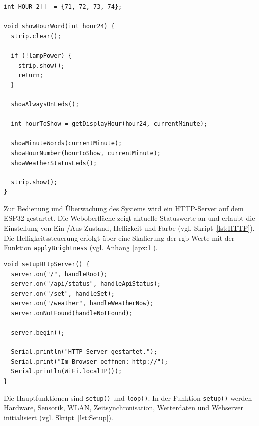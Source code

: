 \begin{lstlisting}[style=arduino,caption={Hauptanzeigefunktion der WordClock.},label={lst:WortSetzen}]
int HOUR_2[]  = {71, 72, 73, 74};

void showHourWord(int hour24) {
  strip.clear();

  if (!lampPower) {
    strip.show();
    return;
  }

  showAlwaysOnLeds();

  int hourToShow = getDisplayHour(hour24, currentMinute);

  showMinuteWords(currentMinute);
  showHourNumber(hourToShow, currentMinute);
  showWeatherStatusLeds();

  strip.show();
}
\end{lstlisting}  

Zur Bedienung und Überwachung des Systems wird ein HTTP-Server auf dem ESP32 gestartet.
Die Weboberfläche zeigt aktuelle Statuswerte an und erlaubt die Einstellung von Ein-/Aus-Zustand, Helligkeit und Farbe (vgl. Skript~\ref{lst:HTTP}).
Die Helligkeitssteuerung erfolgt über eine Skalierung der \gls{rgb}-Werte mit der Funktion \texttt{applyBrightness} (vgl. Anhang~\ref{apx:1}).

\begin{lstlisting}[style=arduino,caption={Registrierung der Webserver-Routen.},label={lst:HTTP}]
void setupHttpServer() {
  server.on("/", handleRoot);
  server.on("/api/status", handleApiStatus);
  server.on("/set", handleSet);
  server.on("/weather", handleWeatherNow);
  server.onNotFound(handleNotFound);

  server.begin();

  Serial.println("HTTP-Server gestartet.");
  Serial.print("Im Browser oeffnen: http://");
  Serial.println(WiFi.localIP());
}
\end{lstlisting}

Die Hauptfunktionen sind \texttt{setup()} und \texttt{loop()}.
In der Funktion \texttt{setup()} werden Hardware, Sensorik, WLAN, Zeitsynchronisation, Wetterdaten und Webserver initialisiert (vgl. Skript~\ref{lst:Setup}).

